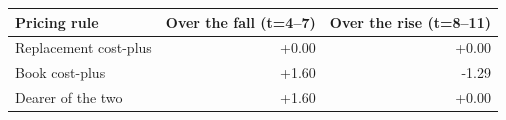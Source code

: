 \begin{tabular}{lrr}
\toprule
Pricing rule & Over the fall (t=4--7) & Over the rise (t=8--11) \\
\midrule
Replacement cost-plus & +0.00 & +0.00 \\
Book cost-plus & +1.60 & -1.29 \\
Dearer of the two & +1.60 & +0.00 \\
\bottomrule
\end{tabular}